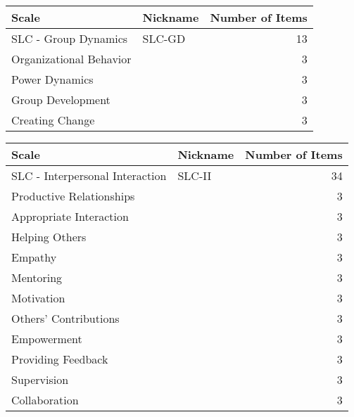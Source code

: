 \documentclass[11pt]{article}
\begin{document}
\begin{center}
\begin{tabular}{llr}
Scale & Nickname & Number of Items\\
\hline
SLC - Group Dynamics & SLC-GD & 13\\
\hline
Organizational Behavior &  & 3\\
Power Dynamics &  & 3\\
Group Development &  & 3\\
Creating Change &  & 3\\
\end{tabular}
\end{center}

\begin{center}
\begin{tabular}{llr}
Scale & Nickname & Number of Items\\
\hline
SLC - Interpersonal Interaction & SLC-II & 34\\
\hline
Productive Relationships &  & 3\\
Appropriate Interaction &  & 3\\
Helping Others &  & 3\\
Empathy &  & 3\\
Mentoring &  & 3\\
Motivation &  & 3\\
Others’ Contributions &  & 3\\
Empowerment &  & 3\\
Providing Feedback &  & 3\\
Supervision &  & 3\\
Collaboration &  & 3\\
\end{tabular}
\end{center}
\end{document}
